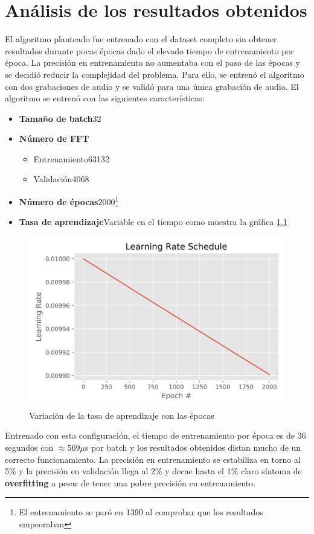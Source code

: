 \chapter{Análisis de los resultados obtenidos}\label{ch: results}
El algoritmo planteado fue entrenado con el dataset completo sin obtener resultados durante pocas épocas dado el elevado tiempo de entrenamiento por época. La precisión en entrenamiento no aumentaba con el paso de las épocas y se decidió reducir la complejidad del problema. Para ello, se entrenó el algoritmo con dos grabaciones de audio y se validó para una única grabación de audio. El algoritmo se entrenó con las siguientes características:
\begin{itemize}
	\item \textbf{Tamaño de batch}32
	\item \textbf{Número de \gls{FFT}}
	\begin{itemize}
		\item Entrenamiento63132
		\item Validación4068
	\end{itemize}
	\item \textbf{Número de épocas}2000\footnote{El entrenamiento se paró en 1390 al comprobar que los resultados empeoraban}
	\item \textbf{Tasa de aprendizaje}Variable en el tiempo como muestra la gráfica \ref{fig: learning_rate}
\end{itemize}

\begin{figure}[h!]
	\centering
	\includegraphics[width=0.75\columnwidth]{figures/Learning_rate_schedule}
	\caption{Variación de la tasa de aprendizaje con las épocas}
	\label{fig: learning_rate}
\end{figure}

Entrenado con esta configuración, el tiempo de entrenamiento por época es de 36 segundos con $\approx 569\mu$s por batch y los resultados obtenidos distan mucho de un correcto funcionamiento. La precisión en entrenamiento se estabiliza en torno al 5\% y la precisión en validación llega al 2\% y decae hasta el 1\% claro síntoma de \textbf{overfitting} a pesar de tener una pobre precisión en entrenamiento.

